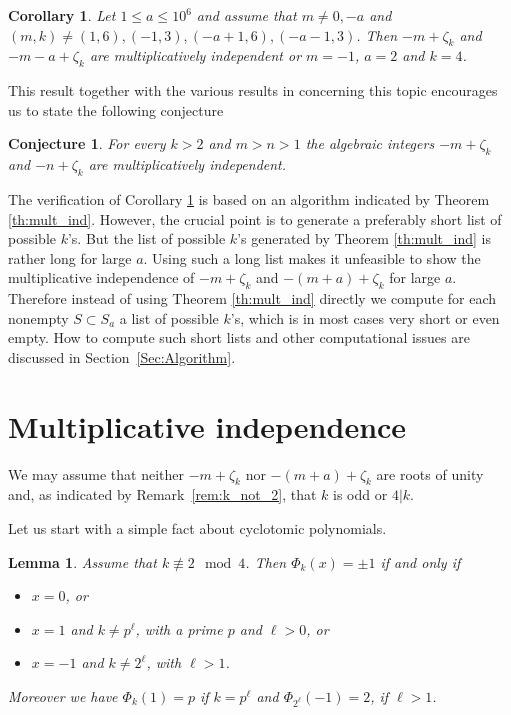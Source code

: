 \documentclass{amsart}
\theoremstyle{plain}
\numberwithin{equation}{section}
\newtheorem{lemma}[thm]{Lemma}
\newtheorem{conjecture}[thm]{Conjecture}
\newtheorem{cor}[thm]{Corollary}
\theoremstyle{remark}
\begin{document}
\begin{cor}\label{Cor:small_a}
  Let $1\leq a \leq 10^6$ and assume that $m\neq 0,-a$ and $(m,k)\neq
  (1,6),(-1,3),(-a+1,6),(-a-1,3)$. Then $-m+\zeta_k$ and
  $-m-a+\zeta_k$ are multiplicatively independent or $m=-1$, $a=2$ and $k=4$.
\end{cor}

This result together with the various results in \cite{Madritsch:2014}
concerning this topic encourages us to state the following
conjecture

\begin{conjecture}
  For every $k>2$ and $m>n>1$ the algebraic integers $-m+\zeta_k$ and
  $-n+\zeta_k$ are multiplicatively independent.
\end{conjecture}

The verification of Corollary \ref{Cor:small_a} is based on an
algorithm indicated by Theorem \ref{th:mult_ind}. However, the crucial
point is to generate a preferably short list of possible $k$'s. But
the list of possible $k$'s generated by Theorem \ref{th:mult_ind} is
rather long for large $a$. Using such a long list makes it unfeasible
to show the multiplicative independence of $-m+\zeta_k$ and
$-(m+a)+\zeta_k$ for large $a$. Therefore instead of using Theorem
\ref{th:mult_ind} directly we compute for each nonempty $S\subset S_a$
a list of possible $k$'s, which is in most cases very short or even
empty. How to compute such short lists and other computational issues
are discussed in Section~\ref{Sec:Algorithm}.

\section{Multiplicative independence}\label{Sec:Mult_Ind}

We may assume that neither $-m+\zeta_k$ nor $-(m+a)+\zeta_k$ are roots of unity
and, as indicated by Remark~\ref{rem:k_not_2}, that $k$ is odd or $4|k$.

Let us start with a simple fact about cyclotomic polynomials.

\begin{lemma}\label{lem:Cyclotomic_pol}
 Assume that $k\not\equiv 2 \mod 4$. Then $\Phi_k(x)=\pm 1$ if and only if 
 \begin{itemize}
  \item  $x=0$, or
  \item $x=1$ and $k\neq p^\ell$, with a prime $p$ and $\ell>0$, or
  \item $x=-1$ and $k\neq 2^\ell$, with $\ell>1$.
 \end{itemize} 
  Moreover we have $\Phi_k(1)=p$ if $k=p^\ell$ and $\Phi_{2^\ell}(-1)=2$, if $\ell>1$.
\end{lemma}
\end{document}
